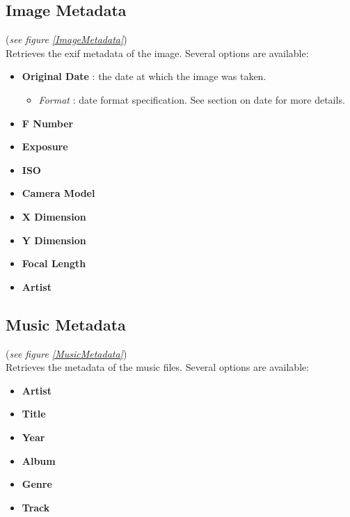\documentclass[10pt, a4paper]{scrartcl}
\begin{document}
\subsection*{Image Metadata}
(\emph{see figure \ref{ImageMetadata}})\\
Retrieves the exif metadata of the image. Several options are available:
\begin{itemize}
        \item \textbf{Original Date} : the date at which the image was taken.
                \begin{itemize}
                        \item \emph{Format} : date format specification. See section on date for more details. 
                \end{itemize}
        \item \textbf{F Number}
        \item \textbf{Exposure}
        \item \textbf{ISO}
        \item \textbf{Camera Model}
        \item \textbf{X Dimension}
        \item \textbf{Y Dimension}
        \item \textbf{Focal Length}
        \item \textbf{Artist}
\end{itemize}

\subsection*{Music Metadata}
(\emph{see figure \ref{MusicMetadata}})\\
Retrieves the metadata of the music files. Several options are available:
\begin{itemize}
        \item \textbf{Artist}
        \item \textbf{Title} 
        \item \textbf{Year}
        \item \textbf{Album} 
        \item \textbf{Genre} 
        \item \textbf{Track} 
\end{itemize}
\end{document}
